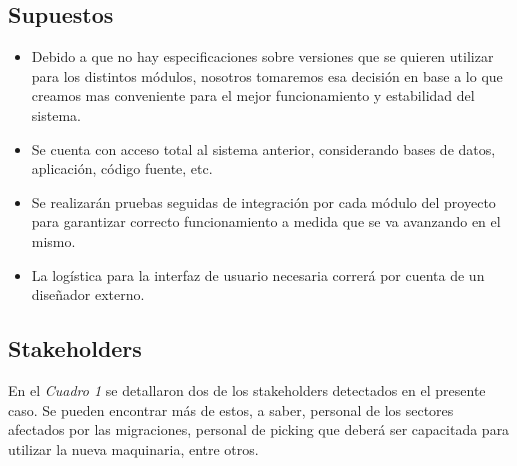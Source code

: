 \documentclass{article}
\begin{document}
\medskip


\subsection{Supuestos}

	\begin{itemize}
		\itemsep=3pt \topsep=0pt \partopsep=0pt \parskip=0pt \parsep=0pt
		\item Debido a que no hay especificaciones sobre versiones que se quieren utilizar para los distintos módulos, nosotros tomaremos esa decisión en base a lo que creamos mas conveniente para el mejor funcionamiento y estabilidad del sistema.
		\item Se cuenta con acceso total al sistema anterior, considerando bases de datos, aplicación, código fuente, etc.
		\item Se realizarán pruebas seguidas de integración por cada módulo del proyecto para garantizar correcto funcionamiento a medida que se va avanzando en el mismo.
		\item La logística para la interfaz de usuario necesaria correrá por cuenta de un diseñador externo. 
	\end{itemize}
\medskip


\subsection{Stakeholders}

	En el \textit{Cuadro 1} se detallaron dos de los stakeholders detectados en el presente caso. Se pueden encontrar más de estos, a saber, personal de los sectores afectados por las migraciones, personal de picking que deberá ser capacitada para utilizar la nueva maquinaria, entre otros.
	\medskip
\end{document}
